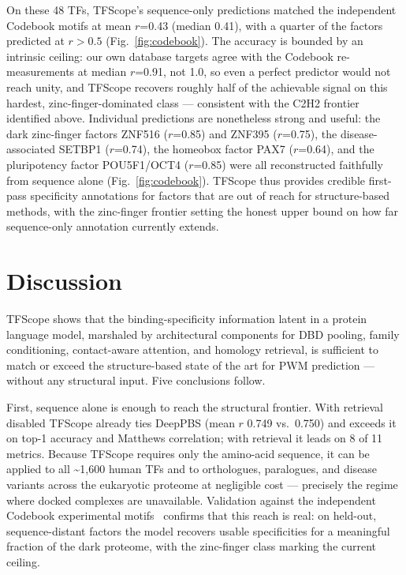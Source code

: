 \documentclass[11pt,letterpaper]{article}
\newcommand{\ts}{\textasciitilde}
\begin{document}
On these 48 TFs, TFScope's sequence-only predictions matched the independent Codebook
motifs at mean $r$=0.43 (median 0.41), with a quarter of the factors predicted at
$r>0.5$ (Fig.~\ref{fig:codebook}). The accuracy is bounded by an intrinsic ceiling:
our own database targets agree with the Codebook re-measurements at median $r$=0.91,
not 1.0, so even a perfect predictor would not reach unity, and TFScope recovers
roughly half of the achievable signal on this hardest, zinc-finger-dominated class —
consistent with the C2H2 frontier identified above. Individual predictions are
nonetheless strong and useful: the dark zinc-finger factors ZNF516 ($r$=0.85) and
ZNF395 ($r$=0.75), the disease-associated SETBP1 ($r$=0.74), the homeobox factor PAX7
($r$=0.64), and the pluripotency factor POU5F1/OCT4 ($r$=0.85) were all reconstructed
faithfully from sequence alone (Fig.~\ref{fig:codebook}). TFScope thus provides
credible first-pass specificity annotations for factors that are out of reach for
structure-based methods, with the zinc-finger frontier setting the honest upper bound
on how far sequence-only annotation currently extends.

\section*{Discussion}

TFScope shows that the binding-specificity information latent in a protein language
model, marshaled by architectural components for DBD pooling, family conditioning,
contact-aware attention, and homology retrieval, is sufficient to match or exceed
the structure-based state of the art for PWM prediction — without any structural
input. Five conclusions follow.

First, sequence alone is enough to reach the structural frontier. With retrieval
disabled TFScope already ties DeepPBS (mean $r$ 0.749 vs.\ 0.750) and exceeds it on
top-1 accuracy and Matthews correlation; with retrieval it leads on 8 of 11 metrics.
Because TFScope requires only the amino-acid sequence, it can be applied to all
\ts1,600 human TFs and to orthologues, paralogues, and disease variants across the
eukaryotic proteome at negligible cost — precisely the regime where docked complexes
are unavailable. Validation against the independent Codebook experimental
motifs~\cite{Codebook2024} confirms that this reach is real: on held-out,
sequence-distant factors the model recovers usable specificities for a meaningful
fraction of the dark proteome, with the zinc-finger class marking the current
ceiling.
\end{document}
